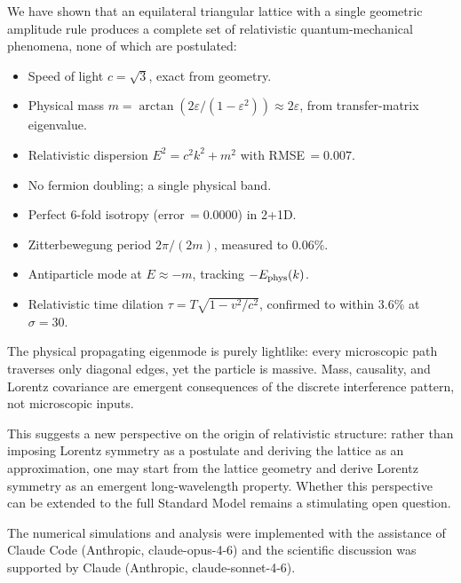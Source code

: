 \documentclass[twocolumn,showpacs,preprintnumbers,amsmath,amssymb]{revtex4-2}
\newcommand{\eps}{\varepsilon}
\begin{document}
We have shown that an equilateral triangular lattice with a single geometric
amplitude rule produces a complete set of relativistic quantum-mechanical
phenomena, none of which are postulated:
\begin{itemize}
  \item Speed of light $c = \sqrt{3}$, exact from geometry.
  \item Physical mass $m = \arctan(2\eps/(1-\eps^2)) \approx 2\eps$,
        from transfer-matrix eigenvalue.
  \item Relativistic dispersion $E^2 = c^2k^2 + m^2$ with RMSE\,$= 0.007$.
  \item No fermion doubling; a single physical band.
  \item Perfect 6-fold isotropy (error\,$= 0.0000$) in 2+1D.
  \item Zitterbewegung period $2\pi/(2m)$, measured to $0.06\%$.
  \item Antiparticle mode at $E \approx -m$, tracking $-E_{\rm phys}(k)$.
  \item Relativistic time dilation $\tau = T\sqrt{1 - v^2/c^2}$, confirmed
        to within $3.6\%$ at $\sigma = 30$.
\end{itemize}
The physical propagating eigenmode is purely lightlike: every microscopic path
traverses only diagonal edges, yet the particle is massive.
Mass, causality, and Lorentz covariance are emergent consequences of the
discrete interference pattern, not microscopic inputs.

This suggests a new perspective on the origin of relativistic structure:
rather than imposing Lorentz symmetry as a postulate and deriving the lattice
as an approximation, one may start from the lattice geometry and derive
Lorentz symmetry as an emergent long-wavelength property.
Whether this perspective can be extended to the full Standard Model remains
a stimulating open question.

\begin{acknowledgments}
The numerical simulations and analysis were implemented with the assistance
of Claude Code (Anthropic, claude-opus-4-6) and the scientific discussion
was supported by Claude (Anthropic, claude-sonnet-4-6).
\end{acknowledgments}
\end{document}
